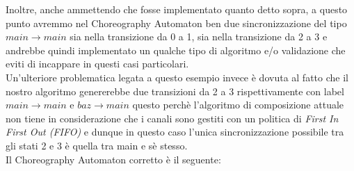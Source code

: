 Inoltre, anche ammettendo che fosse implementato quanto detto sopra, a questo punto avremmo nel Choreography Automaton ben due sincronizzazione del tipo $main \rightarrow main$ sia nella transizione da 0 a 1, sia nella transizione da 2 a 3 e andrebbe quindi implementato un qualche tipo di algoritmo e/o validazione che eviti di incappare in questi casi particolari.\\
Un'ulteriore problematica legata a questo esempio invece è dovuta al fatto che il nostro algoritmo genererebbe due transizioni da 2 a 3 rispettivamente con label $main \rightarrow main$ e $baz \rightarrow main$ questo perchè l'algoritmo di composizione attuale non tiene in considerazione che i canali sono gestiti con un politica di \emph{First In First Out (FIFO)} e dunque in questo caso l'unica sincronizzazione possibile tra gli stati 2 e 3 è quella tra main e sè stesso.\bigskip \\
Il Choreography Automaton corretto è il seguente:
\begin{figure}[h!]
    \centering
\end{figure}